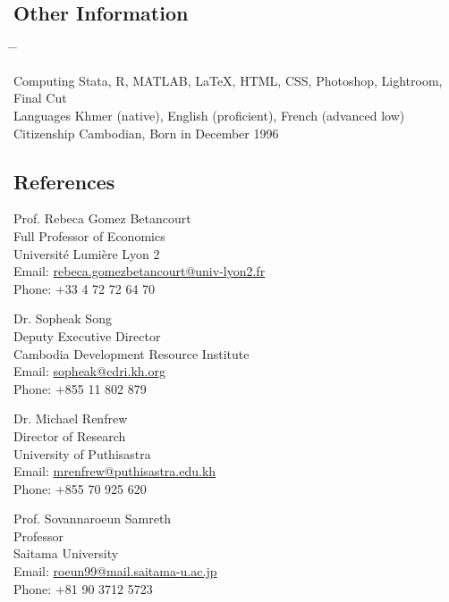 \documentclass[10pt,a4paper]{article}
\newcommand{\tabbedblock}[1]{

	\begin{tabbing}
		\hspace{2cm} \= \hspace{4cm} \= \kill
		#1
	\end{tabbing}
}
\begin{document}
\subsection*{Other Information}

\tabbedblock{
	Computing \> Stata, R, MATLAB, \LaTeX, HTML, CSS, Photoshop, Lightroom, Final Cut\\
	
	Languages \> Khmer (native), English (proficient), French (advanced low)\\
	
	Citizenship \> Cambodian, Born in December 1996
}


\subsection*{References}		

\parbox{0.5\textwidth}{ %
	Prof. Rebeca Gomez Betancourt\\ 
	Full Professor of Economics\\ 
	Université Lumière Lyon 2\\
	Email: \href{mailto: Phone: rebeca.gomezbetancourt@univ-lyon2.fr}{rebeca.gomezbetancourt@univ-lyon2.fr}\\
	Phone: +33 4 72 72 64 70
}
\hfill %
\parbox{0.5\textwidth}{ %
	Dr. Sopheak Song\\ 
	Deputy Executive Director \\
	Cambodia Development Resource Institute\\ 
	Email: \href{mailto: sopheak@cdri.kh.org}{sopheak@cdri.kh.org}\\
	Phone: +855 11 802 879
}

\vspace{1.5em}

\parbox{0.5\textwidth}{ %
	Dr. Michael Renfrew\\ 
	Director of Research\\
	University of Puthisastra\\ 
	Email: \href{mailto: mrenfrew@puthisastra.edu.kh}{mrenfrew@puthisastra.edu.kh}\\
	Phone: +855 70 925 620
}
\hfill %
\parbox{0.5\textwidth}{ %
	Prof. Sovannaroeun Samreth \\ 
	Professor \\
	Saitama University \\
	Email: \href{mailto: roeun99@mail.saitama-u.ac.jp}{roeun99@mail.saitama-u.ac.jp}\\
	Phone: +81 90 3712 5723
}
\end{document}
